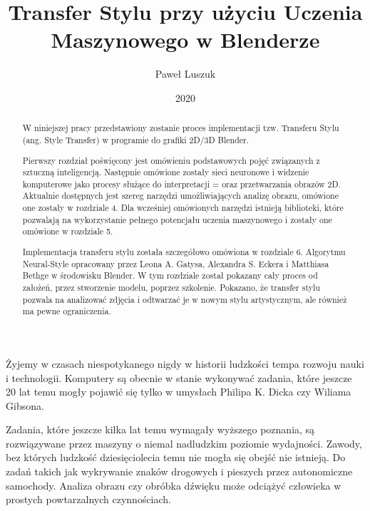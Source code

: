 \documentclass[brudnopis]{xmgr}
\author   {Paweł Luszuk}
\title    {Transfer Stylu przy użyciu Uczenia Maszynowego w Blenderze}
\date     {2020}
\begin{document}
\begin{abstract}

W niniejszej pracy przedstawiony zostanie proces implementacji tzw. Transferu Stylu (ang. Style Transfer) w programie do grafiki 2D/3D Blender.

Pierwszy rozdział poświęcony jest omówieniu podstawowych pojęć związanych z sztuczną inteligencją. Następnie omówione zostały sieci neuronowe i widzenie komputerowe jako procesy służące do interpretacji = oraz przetwarzania obrazów 2D. Aktualnie dostępnych jest szereg narzędzi umożliwiających analizę obrazu, omówione one zostały w rozdziale 4. Dla wcześniej omówionych narzędzi istnieją biblioteki, które pozwalają na wykorzystanie pełnego potencjału uczenia maszynowego i zostały one omówione w rozdziale 5.

Implementacja transferu stylu została szczegółowo omówiona w rozdziale 6. Algorytmu Neural-Style opracowany przez Leona A. Gatysa, Alexandra S. Eckera i Matthiasa Bethge w środowisku Blender. W tym rozdziale został pokazany cały proces od założeń, przez stworzenie modelu, poprzez szkolenie. Pokazano, że transfer stylu pozwala na analizować zdjęcia i odtwarzać je w nowym stylu artystycznym, ale również ma pewne ograniczenia. 


\end{abstract}


\maketitle

\introduction

Żyjemy w czasach niespotykanego nigdy w historii ludzkości tempa rozwoju nauki i technologii. Komputery są obecnie w stanie wykonywać zadania, które jeszcze 20 lat temu mogły pojawić się tylko w umysłach Philipa K. Dicka czy Wiliama Gibsona.

Zadania, które jeszcze kilka lat temu wymagały wyższego poznania, są rozwiązywane przez maszyny o niemal nadludzkim poziomie wydajności. Zawody, bez których ludzkość dziesięciolecia temu nie mogła się obejść nie istnieją. Do zadań takich jak wykrywanie znaków drogowych i pieszych przez autonomiczne samochody. Analiza obrazu czy obróbka dźwięku może odciążyć człowieka w prostych powtarzalnych czynnościach.
\end{document}
